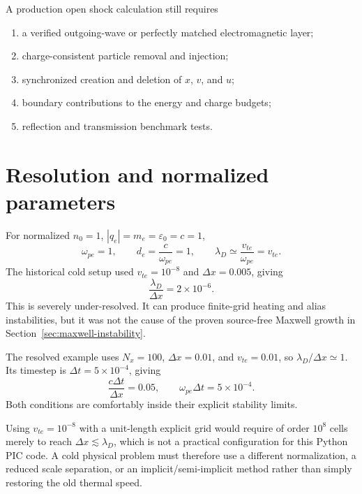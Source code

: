 \documentclass[11pt,a4paper]{article}
\newcommand{\epsz}{\varepsilon_0}
\begin{document}
A production open shock calculation still requires
\begin{enumerate}
  \item a verified outgoing-wave or perfectly matched electromagnetic layer;
  \item charge-consistent particle removal and injection;
  \item synchronized creation and deletion of $x$, $v$, and $u$;
  \item boundary contributions to the energy and charge budgets;
  \item reflection and transmission benchmark tests.
\end{enumerate}

\section{Resolution and normalized parameters}

For normalized $n_0=1$, $|q_e|=m_e=\epsz=c=1$,
\begin{equation}
  \omega_{pe}=1,\qquad d_e=\frac{c}{\omega_{pe}}=1,
  \qquad \lambda_D\simeq\frac{v_{te}}{\omega_{pe}}=v_{te}.
\end{equation}
The historical cold setup used $v_{te}=10^{-8}$ and $\Delta x=0.005$, giving
\begin{equation}
  \frac{\lambda_D}{\Delta x}=2\times10^{-6}.
\end{equation}
This is severely under-resolved.  It can produce finite-grid heating and alias
instabilities, but it was not the cause of the proven source-free Maxwell
growth in Section~\ref{sec:maxwell-instability}.

The resolved example uses $N_x=100$, $\Delta x=0.01$, and $v_{te}=0.01$, so
$\lambda_D/\Delta x\simeq1$.  Its timestep is $\Delta t=5\times10^{-4}$,
giving
\begin{equation}
  \frac{c\Delta t}{\Delta x}=0.05,
  \qquad \omega_{pe}\Delta t=5\times10^{-4}.
\end{equation}
Both conditions are comfortably inside their explicit stability limits.

Using $v_{te}=10^{-8}$ with a unit-length explicit grid would require of order
$10^8$ cells merely to reach $\Delta x\lesssim\lambda_D$, which is not a
practical configuration for this Python PIC code.  A cold physical problem
must therefore use a different normalization, a reduced scale separation, or
an implicit/semi-implicit method rather than simply restoring the old thermal
speed.
\end{document}
